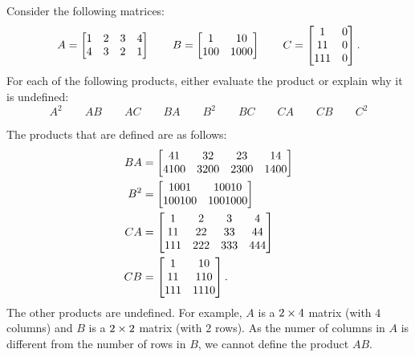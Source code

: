 \documentclass[a4paper]{amsart}
\renewenvironment{solution}{\SolutionInline}{\endSolutionInline}
\begin{document}
\begin{exercise}\label{ex-mat-prod-ii}
 Consider the following matrices:
 \[ A = \left[\begin{matrix} 1&2&3&4 \\ 4&3&2&1 \end{matrix}\right] \qquad
    B = \left[\begin{matrix} 1 & 10 \\ 100 & 1000 \end{matrix}\right] \qquad
    C = \left[\begin{matrix} 1 & 0 \\ 11 & 0 \\ 111 & 0 \end{matrix}\right].
 \]
 For each of the following products, either evaluate the product or
 explain why it is undefined:
 \[ A^2 \qquad AB \qquad AC \qquad
    BA \qquad B^2 \qquad BC \qquad
    CA \qquad CB \qquad C^2
 \]
\end{exercise}
\begin{solution}
 The products that are defined are as follows:
 \begin{align*}
  BA &= \left[\begin{matrix} 41 & 32 & 23 & 14 \\ 4100 & 3200 & 2300 & 1400 \end{matrix}\right] \\
  B^2 &= \left[\begin{matrix} 1001 & 10010 \\ 100100 & 1001000 \end{matrix}\right] \\
  CA &= \left[\begin{matrix} 1 & 2 & 3 & 4 \\
             11 & 22 & 33 & 44 \\
             111 & 222 & 333 & 444 \end{matrix}\right] \\
  CB &= \left[\begin{matrix} 1 & 10 \\ 11 & 110 \\ 111 & 1110 \end{matrix}\right].
 \end{align*}
 The other products are undefined.  For example, $A$ is a $2\times 4$
 matrix (with $4$ columns) and $B$ is a $2\times 2$ matrix (with $2$
 rows).  As the numer of columns in $A$ is different from the number
 of rows in $B$, we cannot define the product $AB$.  
\end{solution}
\end{document}

